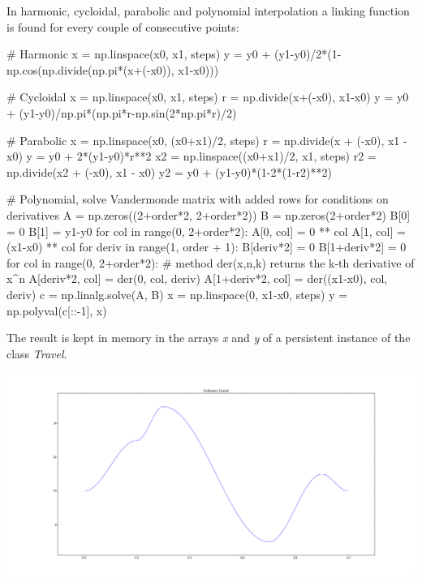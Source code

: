\documentclass[a4paper,10pt,twoside]{article}
\begin{document}
    In harmonic, cycloidal, parabolic and polynomial interpolation a linking function is found
    for every couple of consecutive points:

    \begin{pycode}
    # Harmonic
    x = np.linspace(x0, x1, steps)
    y = y0 + (y1-y0)/2*(1-np.cos(np.divide(np.pi*(x+(-x0)), x1-x0)))
    
    # Cycloidal
    x = np.linspace(x0, x1, steps)
    r = np.divide(x+(-x0), x1-x0)
    y = y0 + (y1-y0)/np.pi*(np.pi*r-np.sin(2*np.pi*r)/2)
    
    # Parabolic
    x = np.linspace(x0, (x0+x1)/2, steps)
    r = np.divide(x + (-x0), x1 - x0)
    y = y0 + 2*(y1-y0)*r**2
    x2 = np.linspace((x0+x1)/2, x1, steps)
    r2 = np.divide(x2 + (-x0), x1 - x0)
    y2 = y0 + (y1-y0)*(1-2*(1-r2)**2)
    
    # Polynomial, solve Vandermonde matrix with added rows for conditions on derivatives
    A = np.zeros((2+order*2, 2+order*2))
    B = np.zeros(2+order*2)
    B[0] = 0
    B[1] = y1-y0
    for col in range(0, 2+order*2):
        A[0, col] = 0 ** col
        A[1, col] = (x1-x0) ** col
    for deriv in range(1, order + 1):
        B[deriv*2] = 0
        B[1+deriv*2] = 0
        for col in range(0, 2+order*2):
            # method der(x,n,k) returns the k-th derivative of x^n
            A[deriv*2, col] = der(0, col, deriv)
            A[1+deriv*2, col] = der((x1-x0), col, deriv)
    c = np.linalg.solve(A, B)
    x = np.linspace(0, x1-x0, steps)
    y = np.polyval(c[::-1], x)
    \end{pycode}

    The result is kept in memory in the arrays \emph{x} and \emph{y} of a persistent
    instance of the class \emph{Travel}.

    \includegraphics[width=\textwidth]{travel.png}
\end{document}
